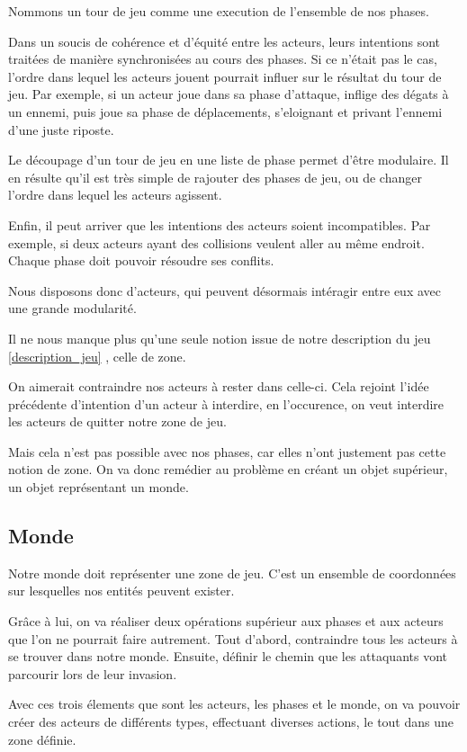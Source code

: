 \documentclass{article}
\begin{document}
Nommons un tour de jeu comme une execution de l'ensemble de nos phases.

Dans un soucis de cohérence et d'équité entre les acteurs, 
leurs intentions sont traitées de manière synchronisées au cours des phases.
Si ce n'était pas le cas, l'ordre dans lequel les acteurs jouent pourrait influer 
sur le résultat du tour de jeu. Par exemple, si un acteur joue dans sa 
phase d'attaque, inflige des dégats à un ennemi, puis joue sa phase de déplacements,
s'eloignant et privant l'ennemi d'une juste riposte.

Le découpage d'un tour de jeu en une liste de phase permet d'être modulaire.
Il en résulte qu'il est très simple de rajouter des phases de jeu, ou de 
changer l'ordre dans lequel les acteurs agissent.

Enfin, il peut arriver que les intentions des acteurs soient incompatibles.
Par exemple, si deux acteurs ayant des collisions veulent aller au même endroit.
Chaque phase doit pouvoir résoudre ses conflits.

Nous disposons donc d'acteurs, qui peuvent désormais intéragir entre eux avec 
une grande modularité.

Il ne nous manque plus qu'une seule notion issue de notre description du jeu 
\ref{description_jeu} , celle de zone.

On aimerait contraindre nos acteurs à rester dans celle-ci. Cela 
rejoint l'idée précédente d'intention d'un acteur à interdire, en l'occurence, 
on veut interdire les acteurs de quitter notre zone de jeu.

Mais cela n'est pas possible avec nos phases, car elles n'ont justement pas 
cette notion de zone.
On va donc remédier au problème en créant un objet supérieur, un objet représentant 
un monde.

\subsection{Monde}

Notre monde doit représenter une zone de jeu.
C'est un ensemble de coordonnées sur lesquelles nos entités peuvent exister.

Grâce à lui, on va réaliser deux opérations supérieur aux phases et aux acteurs que 
l'on ne pourrait faire autrement.
Tout d'abord, contraindre tous les acteurs à se trouver dans notre monde.
Ensuite, définir le chemin que les attaquants vont parcourir lors de leur 
invasion.

Avec ces trois élements que sont les acteurs, les phases et le monde, on va pouvoir 
créer des acteurs de différents types, effectuant diverses actions, le tout dans une 
zone définie.
\end{document}
